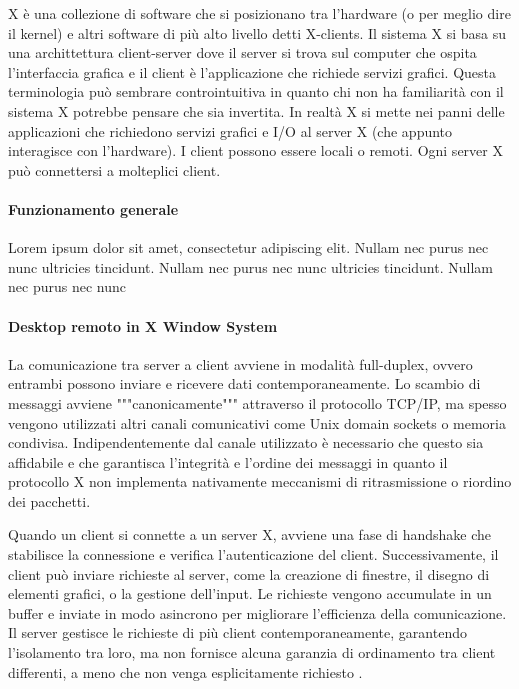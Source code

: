 \documentclass[12pt,a4paper,openright,twoside]{book}
\begin{document}
X è una collezione di software che si posizionano tra l'hardware (o per meglio dire il kernel) e altri software di più alto livello detti X-clients. Il sistema X si basa su una archittettura client-server dove il server si trova sul computer che ospita l'interfaccia grafica e il client è l'applicazione che richiede servizi grafici. Questa terminologia può sembrare controintuitiva in quanto chi non ha familiarità con il sistema X potrebbe pensare che sia invertita. In realtà X si mette nei panni delle applicazioni che richiedono servizi grafici e I/O al server X (che appunto interagisce con l'hardware).
I client possono essere locali o remoti. Ogni server X può connettersi a molteplici client.

\paragraph{Funzionamento generale}

Lorem ipsum dolor sit amet, consectetur adipiscing elit. Nullam nec purus nec nunc ultricies tincidunt. Nullam nec purus nec nunc ultricies tincidunt. Nullam nec purus nec nunc

\paragraph{Desktop remoto in X Window System}

La comunicazione tra server a client avviene in modalità full-duplex, ovvero entrambi possono inviare e ricevere dati contemporaneamente. Lo scambio di messaggi avviene """canonicamente""" attraverso il protocollo TCP/IP, ma spesso vengono utilizzati altri canali comunicativi come Unix domain sockets o memoria condivisa. Indipendentemente dal canale utilizzato è necessario che questo sia affidabile e che garantisca l'integrità e l'ordine dei messaggi in quanto il protocollo X non implementa nativamente meccanismi di ritrasmissione o riordino dei pacchetti.

Quando un client si connette a un server X, avviene una fase di handshake che stabilisce la connessione e verifica l'autenticazione del client. Successivamente, il client può inviare richieste al server, come la creazione di finestre, il disegno di elementi grafici, o la gestione dell'input. Le richieste vengono accumulate in un buffer e inviate in modo asincrono per migliorare l'efficienza della comunicazione. Il server gestisce le richieste di più client contemporaneamente, garantendo l'isolamento tra loro, ma non fornisce alcuna garanzia di ordinamento tra client differenti, a meno che non venga esplicitamente richiesto \cite{coopersmith2024x}.
\end{document}
